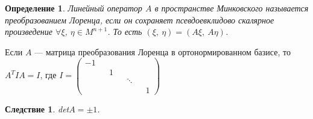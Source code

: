 \documentclass[12pt]{article}
\theoremstyle{plain}
\newtheorem{consequence}{Следствие}[theorem]
\newtheorem{definition}{Определение}[section]
\begin{document}
    \begin{definition}
        Линейный оператор $A$ в пространстве Минковского называется преобразованием Лоренца, если он сохраняет псевдоевклидово скалярное произведение $\forall\xi$, $\eta\in M^{n+1}$. То есть $(\xi, \ \eta)=(A\xi, \ A\eta)$.
    \end{definition}
    Если $A$ --- матрица преобразования Лоренца в ортонормированном базисе, то\\$A^TIA=I$, где $I=\begin{pmatrix}
        -1 && && && \\
        && 1 && && \\
        && && \ddots &&\\
        && && && 1
    \end{pmatrix}$
    \begin{consequence}
        det$A=\pm1$.
    \end{consequence}
\end{document}
